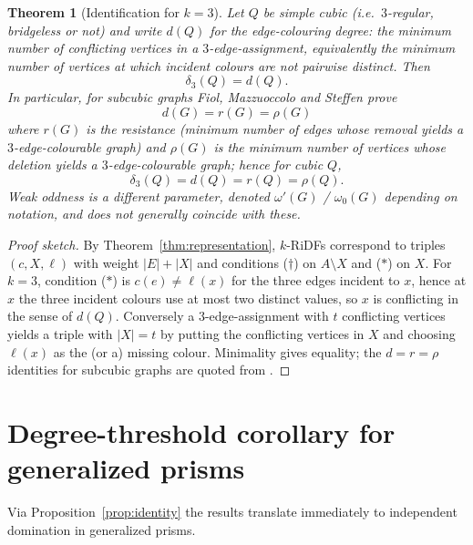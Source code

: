 \documentclass[11pt,a4paper]{article}
\theoremstyle{plain}
\newtheorem{theorem}{Theorem}[section]
\theoremstyle{definition}
\begin{document}
\begin{theorem}[Identification for $k=3$]\label{thm:delta3}
Let $Q$ be simple cubic (i.e.\ $3$-regular, bridgeless or not) and write $d(Q)$ for the edge-colouring degree: the minimum number of conflicting vertices in a $3$-edge-assignment, equivalently the minimum number of vertices at which incident colours are not pairwise distinct. Then
\[
\boxed{\delta_{3}(Q)=d(Q).}
\]
In particular, for subcubic graphs Fiol, Mazzuoccolo and Steffen \cite{FMS2022} prove
\[
d(G)=r(G)=\rho(G)
\]
where $r(G)$ is the resistance (minimum number of edges whose removal yields a $3$-edge-colourable graph) and $\rho(G)$ is the minimum number of vertices whose deletion yields a $3$-edge-colourable graph; hence for cubic $Q$,
\[
\boxed{\delta_{3}(Q)=d(Q)=r(Q)=\rho(Q).}
\]
Weak oddness is a different parameter, denoted $\omega'(G)$ / $\omega_{0}(G)$ depending on notation, and does not generally coincide with these.
\end{theorem}
\begin{proof}[Proof sketch]
By Theorem~\ref{thm:representation}, $k$-RiDFs correspond to triples $(c,X,\ell)$ with weight $|E|+|X|$ and conditions ($\dagger$) on $A\setminus X$ and ($\ast$) on $X$. For $k=3$, condition ($\ast$) is $c(e)\neq\ell(x)$ for the three edges incident to $x$, hence at $x$ the three incident colours use at most two distinct values, so $x$ is conflicting in the sense of $d(Q)$. Conversely a $3$-edge-assignment with $t$ conflicting vertices yields a triple with $|X|=t$ by putting the conflicting vertices in $X$ and choosing $\ell(x)$ as the (or a) missing colour. Minimality gives equality; the $d=r=\rho$ identities for subcubic graphs are quoted from \cite{FMS2022}.
\end{proof}

\section{Degree-threshold corollary for generalized prisms}\label{sec:threshold}

Via Proposition~\ref{prop:identity} the results translate immediately to independent domination in generalized prisms.
\end{document}
